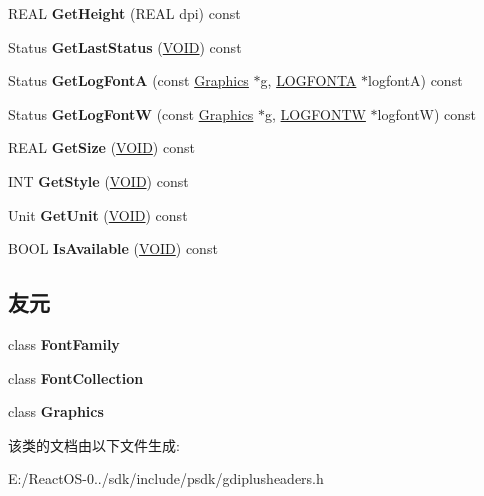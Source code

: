 \begin{DoxyCompactItemize}
R\+E\+AL {\bfseries Get\+Height} (R\+E\+AL dpi) const
\item 
\mbox{\label{class_font_abc2ca9ba3e97f468186d749750664fd6}} 
Status {\bfseries Get\+Last\+Status} (\hyperlink{interfacevoid}{V\+O\+ID}) const
\item 
\mbox{\label{class_font_a034a4ca80a187643081e771d56bb8f82}} 
Status {\bfseries Get\+Log\+FontA} (const \hyperlink{class_graphics}{Graphics} $\ast$g, \hyperlink{struct_l_o_g_f_o_n_t_a}{L\+O\+G\+F\+O\+N\+TA} $\ast$logfontA) const
\item 
\mbox{\label{class_font_abc39acdca87ea38d6177061bb2ed9b77}} 
Status {\bfseries Get\+Log\+FontW} (const \hyperlink{class_graphics}{Graphics} $\ast$g, \hyperlink{struct_l_o_g_f_o_n_t_w}{L\+O\+G\+F\+O\+N\+TW} $\ast$logfontW) const
\item 
\mbox{\label{class_font_af4c256d9c71f5c7817122ef0fea10efd}} 
R\+E\+AL {\bfseries Get\+Size} (\hyperlink{interfacevoid}{V\+O\+ID}) const
\item 
\mbox{\label{class_font_a2bf537e457d033699d2c72b8103aedcb}} 
I\+NT {\bfseries Get\+Style} (\hyperlink{interfacevoid}{V\+O\+ID}) const
\item 
\mbox{\label{class_font_af4dc335b21743d091e42614a4af85b59}} 
Unit {\bfseries Get\+Unit} (\hyperlink{interfacevoid}{V\+O\+ID}) const
\item 
\mbox{\label{class_font_a555f4726351c8f21ea2032c61ccda64b}} 
B\+O\+OL {\bfseries Is\+Available} (\hyperlink{interfacevoid}{V\+O\+ID}) const
\end{DoxyCompactItemize}
\subsection*{友元}
\begin{DoxyCompactItemize}
\item 
\mbox{\label{class_font_ad6878b18624ffb969d26393c4a60a04c}} 
class {\bfseries Font\+Family}
\item 
\mbox{\label{class_font_a95a48eda941229b91bc7f6d834bba872}} 
class {\bfseries Font\+Collection}
\item 
\mbox{\label{class_font_ae5cfe0c0e0b06d536d5814bd1ff4818f}} 
class {\bfseries Graphics}
\end{DoxyCompactItemize}


该类的文档由以下文件生成\+:\begin{DoxyCompactItemize}
\item 
E\+:/\+React\+O\+S-\/0../sdk/include/psdk/gdiplusheaders.\+h\end{DoxyCompactItemize}
